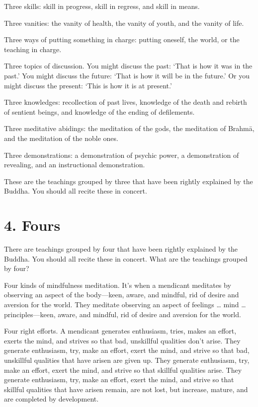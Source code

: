 \documentclass[12pt,openany]{book}%
\begin{document}
Three skills: skill in progress, skill in regress, and skill in means. 

Three vanities: the vanity of health, the vanity of youth, and the vanity of life. 

Three ways of putting something in charge: putting oneself, the world, or the teaching in charge. 

Three topics of discussion. You might discuss the past: ‘That is how it was in the past.’ You might discuss the future: ‘That is how it will be in the future.’ Or you might discuss the present: ‘This is how it is at present.’ 

Three knowledges: recollection of past lives, knowledge of the death and rebirth of sentient beings, and knowledge of the ending of defilements. 

Three meditative abidings: the meditation of the gods, the meditation of \textsanskrit{Brahmā}, and the meditation of the noble ones. 

Three demonstrations: a demonstration of psychic power, a demonstration of revealing, and an instructional demonstration. 

These are the teachings grouped by three that have been rightly explained by the Buddha. You should all recite these in concert. 

\section*{4. Fours }

There are teachings grouped by four that have been rightly explained by the Buddha. You should all recite these in concert. What are the teachings grouped by four? 

Four kinds of mindfulness meditation. It’s when a mendicant meditates by observing an aspect of the body—keen, aware, and mindful, rid of desire and aversion for the world. They meditate observing an aspect of feelings … mind … principles—keen, aware, and mindful, rid of desire and aversion for the world. 

Four right efforts. A mendicant generates enthusiasm, tries, makes an effort, exerts the mind, and strives so that bad, unskillful qualities don’t arise. They generate enthusiasm, try, make an effort, exert the mind, and strive so that bad, unskillful qualities that have arisen are given up. They generate enthusiasm, try, make an effort, exert the mind, and strive so that skillful qualities arise. They generate enthusiasm, try, make an effort, exert the mind, and strive so that skillful qualities that have arisen remain, are not lost, but increase, mature, and are completed by development. 
\end{document}
